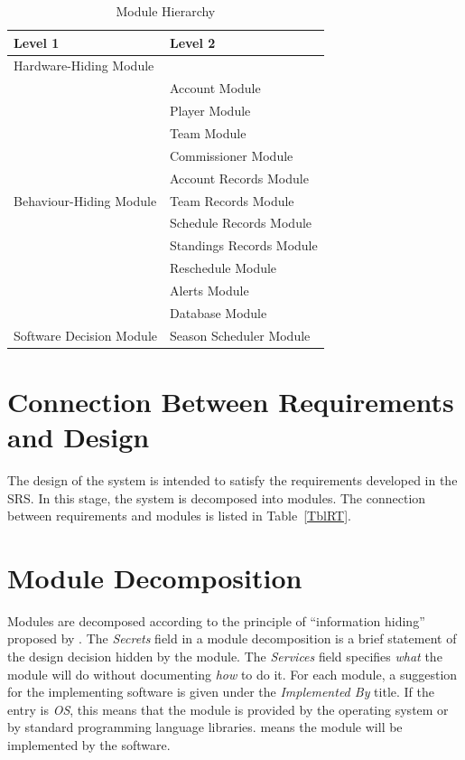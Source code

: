 \documentclass[12pt, titlepage]{article}
\begin{document}
\begin{table}[h!]
\centering
\begin{tabular}{p{} p{}}
\toprule
\textbf{Level 1} & \textbf{Level 2}\\
\midrule

{Hardware-Hiding Module} & ~ \\
\midrule

\multirow{11}{0.3\textwidth}{Behaviour-Hiding Module} & Account Module\\
& Player Module\\
& Team Module\\
& Commissioner Module\\
& Account Records Module\\
& Team Records Module\\
& Schedule Records Module\\
& Standings Records Module\\
& Reschedule Module\\
& Alerts Module\\
& Database Module\\
\midrule

\multirow{2}{0.3\textwidth}{Software Decision Module} & Season Scheduler
Module\\
\bottomrule

\end{tabular}
\caption{Module Hierarchy}
\label{TblMH}
\end{table}

\section{Connection Between Requirements and Design} \label{SecConnection}

The design of the system is intended to satisfy the requirements developed in
the SRS. In this stage, the system is decomposed into modules. The connection
between requirements and modules is listed in Table~\ref{TblRT}.

\section{Module Decomposition} \label{SecMD}

Modules are decomposed according to the principle of ``information hiding''
proposed by \citet{ParnasEtAl1984}. The \emph{Secrets} field in a module
decomposition is a brief statement of the design decision hidden by the
module. The \emph{Services} field specifies \emph{what} the module will do
without documenting \emph{how} to do it. For each module, a suggestion for the
implementing software is given under the \emph{Implemented By} title. If the
entry is \emph{OS}, this means that the module is provided by the operating
system or by standard programming language libraries.  \emph{\progname{}}
means the module will be implemented by the \progname{} software.
\end{document}
